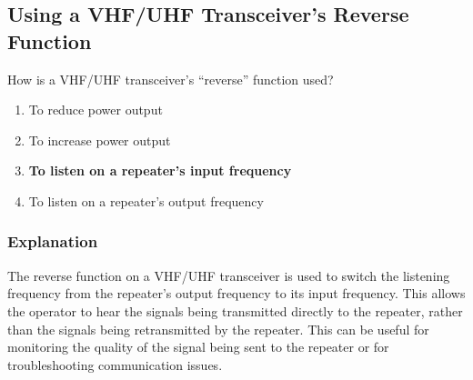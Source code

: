 \subsection{Using a VHF/UHF Transceiver's Reverse Function}
\label{T2B01}

\begin{tcolorbox}[colback=gray!10!white,colframe=black!75!black,title=T2B01]
How is a VHF/UHF transceiver’s “reverse” function used?
\begin{enumerate}[noitemsep]
    \item To reduce power output
    \item To increase power output
    \item \textbf{To listen on a repeater’s input frequency}
    \item To listen on a repeater’s output frequency
\end{enumerate}
\end{tcolorbox}

\subsubsection*{Explanation}
The reverse function on a VHF/UHF transceiver is used to switch the listening frequency from the repeater's output frequency to its input frequency. This allows the operator to hear the signals being transmitted directly to the repeater, rather than the signals being retransmitted by the repeater. This can be useful for monitoring the quality of the signal being sent to the repeater or for troubleshooting communication issues.